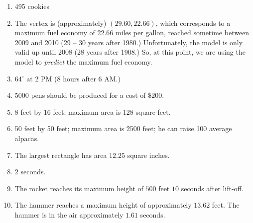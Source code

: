 \documentclass{ximera}
\begin{document}
\begin{enumerate}
\setcounter{enumi}{\value{HW}}


\item 495 cookies

\item The vertex is (approximately) $(29.60, 22.66)$, which corresponds to a maximum fuel economy of 22.66 miles per gallon, reached sometime between 2009 and 2010 (29 -- 30 years after 1980.)  Unfortunately, the model is only valid up until 2008 (28 years after 1908.)  So, at this point, we are using the model to \textit{predict} the maximum fuel economy.



\item  $64^{\circ}$ at 2 PM (8 hours after 6 AM.)

\item  5000 pens should be produced for a cost of $\$200$.

\item 8 feet by 16 feet; maximum area is 128 square feet.

\item 50 feet by 50 feet;  maximum area is 2500 feet;  he can raise 100 average alpacas. 

\item The largest rectangle has area $12.25$ square inches.


\item  $2$ seconds.


\item  The rocket reaches its maximum height of $500$ feet $10$ seconds after lift-off.


\item  The hammer reaches a maximum height of approximately $13.62$ feet.  The hammer is in the air approximately $1.61$ seconds.  

\setcounter{HW}{\value{enumi}}
\end{enumerate}
\end{document}
